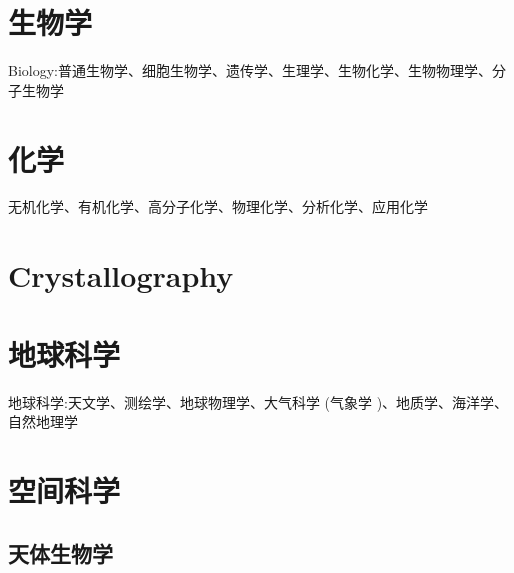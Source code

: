 \documentclass[UTF8]{NatureUniverse}
\begin{document}





\chapter{生物学}    %
Biology:普通生物学、细胞生物学、遗传学、生理学、生物化学、生物物理学、分子生物学





\chapter{化学}    %

无机化学、有机化学、高分子化学、物理化学、分析化学、应用化学


\chapter{Crystallography}    %




\chapter{地球科学}    %

地球科学:天文学、测绘学、地球物理学、大气科学 (气象学 )、地质学、海洋学、自然地理学





\chapter{空间科学}    %
\section{天体生物学}
\end{document}
